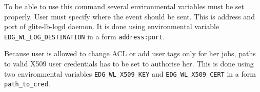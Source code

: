 \bigskip

To be able to use this command several environmental variables must be set properly. User must specify where the event should be sent. This is address and port of glite-lb-logd daemon. It is done using environmental variable \verb'EDG_WL_LOG_DESTINATION' in a form \verb'address:port'.

Because user is allowed to change ACL or add user tags only for her jobs, paths to valid X509 user credentials has to be set to authorise her. This is done using two environmental variables \verb'EDG_WL_X509_KEY' and \verb'EDG_WL_X509_CERT' in a form \verb'path_to_cred'.
